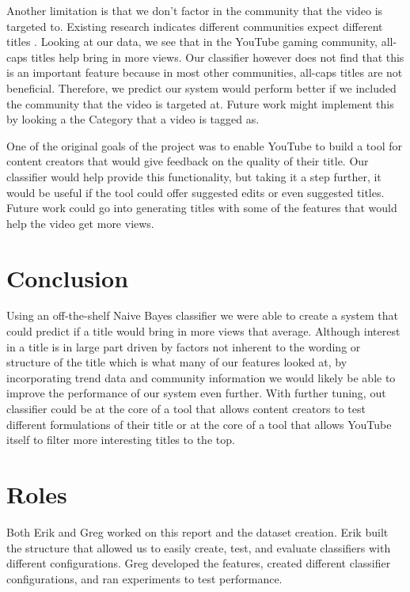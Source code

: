 \documentclass[a4paper,12pt]{article}
\begin{document}
Another limitation is that we don't factor in the community that the video is targeted to. Existing research indicates different communities expect different titles \cite{himabindu+mcauley+leskovec:13}. Looking at our data, we see that in the YouTube gaming community, all-caps titles help bring in more views. Our classifier however does not find that this is an important feature because in most other communities, all-caps titles are not beneficial. Therefore, we predict our system would perform better if we included the community that the video is targeted at. Future work might implement this by looking a the Category that a video is tagged as.


One of the original goals of the project was to enable YouTube to build a tool for content creators that would give feedback on the quality of their title. Our classifier would help provide this functionality, but taking it a step further, it would be useful if the tool could offer suggested edits or even suggested titles. Future work could go into generating titles with some of the features that would help the video get more views.

\section{Conclusion}

Using an off-the-shelf Naive Bayes classifier we were able to create a system that could predict if a title would bring in more views that average. Although interest in a title is in large part driven by factors not inherent to the wording or structure of the title which is what many of our features looked at, by incorporating trend data and community information we would likely be able to improve the performance of our system even further. With further tuning, out classifier could be at the core of a tool that allows content creators to test different formulations of their title or at the core of a tool that allows YouTube itself to filter more interesting titles to the top.





\appendix
\section{Roles}
Both Erik and Greg worked on this report and the dataset creation. Erik built the structure that allowed us to easily create, test, and evaluate classifiers with different configurations. Greg developed the features, created different classifier configurations, and ran experiments to test performance.
\end{document}
